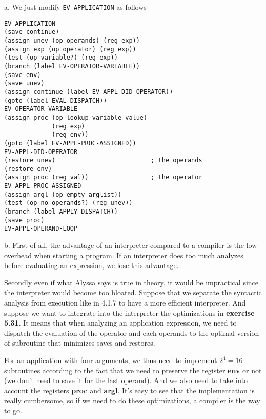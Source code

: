 \documentclass[a4paper,12pt]{article}
\newcommand{\subpar}[1]{\medskip \noindent #1.}
\begin{document}
\subpar{a}  We just modify \lstinline!EV-APPLICATION! as follows
\begin{lstlisting}
EV-APPLICATION
(save continue)
(assign unev (op operands) (reg exp))
(assign exp (op operator) (reg exp))
(test (op variable?) (reg exp))
(branch (label EV-OPERATOR-VARIABLE))
(save env)
(save unev)
(assign continue (label EV-APPL-DID-OPERATOR))
(goto (label EVAL-DISPATCH))
EV-OPERATOR-VARIABLE
(assign proc (op lookup-variable-value)
             (reg exp)
             (reg env))
(goto (label EV-APPL-PROC-ASSIGNED))
EV-APPL-DID-OPERATOR
(restore unev)                          ; the operands
(restore env)
(assign proc (reg val))                 ; the operator
EV-APPL-PROC-ASSIGNED
(assign argl (op empty-arglist))
(test (op no-operands?) (reg unev))
(branch (label APPLY-DISPATCH))
(save proc)
EV-APPL-OPERAND-LOOP
\end{lstlisting}

\subpar{b} First of all, the advantage of an interpreter compared to a
compiler is the low overhead when starting a program.  If an
interpreter does too much analyzes before evaluating an expression, we
lose this advantage.

Secondly even if what Alyssa says is true in theory, it would be
impractical since the interpreter would become too bloated.  Suppose
that we separate the syntactic analysis from execution like in 4.1.7
to have a more efficient interpreter.  And suppose we want to
integrate into the interpreter the optimizations in \textbf{exercise
  5.31}.  It means that when analyzing an application expression, we
need to dispatch the evaluation of the operator and each operands to
the optimal version of subroutine that minimizes saves and restores.

For an application with four arguments, we thus need to implement $2^4
= 16$ subroutines according to the fact that we need to preserve the
register \textbf{env} or not (we don't need to save it for the last
operand).  And we also need to take into account the registers
\textbf{proc} and \textbf{argl}.  It's easy to see that the
implementation is really cumbersome, so if we need to do these
optimizations, a compiler is the way to go.
\end{document}
